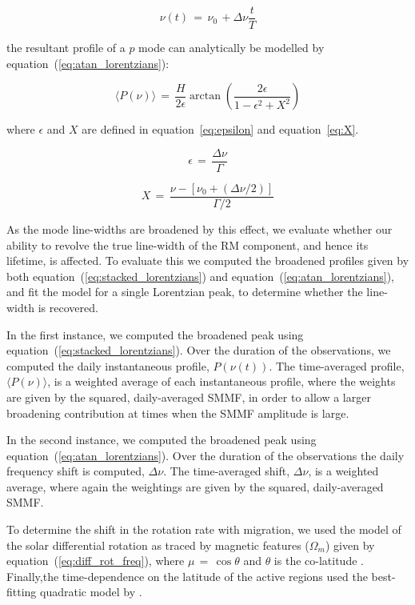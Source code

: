 \begin{equation}
\nu(t) \, = \, \nu_0 \, +  \Delta\nu \frac{t}{T}
\label{eq:linear_variation}
\end{equation}

the resultant profile of a $p$ mode can analytically be modelled by equation~(\ref{eq:atan_lorentzians}):

\begin{equation}
\langle P(\nu) \rangle \, = \, \frac{H}{2\epsilon} \arctan \left( \frac{2 \epsilon}{1 - \epsilon^2 + X^2 } \right)
\label{eq:atan_lorentzians}
\end{equation}

where $\epsilon$ and $X$ are defined in equation~\ref{eq:epsilon} and equation~\ref{eq:X}.

\begin{equation}
\epsilon \, = \, \frac{\Delta\nu}{\Gamma}
\label{eq:epsilon}
\end{equation}

\begin{equation}
X \, = \, \frac{\nu - [\nu_0 + (\Delta\nu/2)]}{\Gamma /2}
\label{eq:X}
\end{equation}

As the mode line-widths are broadened by this effect, we evaluate whether our ability to revolve the true line-width of the RM component, and hence its lifetime, is affected. To evaluate this we computed the broadened profiles given by both equation~(\ref{eq:stacked_lorentzians}) and equation~(\ref{eq:atan_lorentzians}), and fit the model for a single Lorentzian peak, to determine whether the line-width is recovered.

In the first instance, we computed the broadened peak using equation~(\ref{eq:stacked_lorentzians}). Over the duration of the observations, we computed the daily instantaneous profile, $P(\nu(t))$. The time-averaged profile, $ \langle P(\nu) \rangle$, is a weighted average of each instantaneous profile, where the weights are given by the squared, daily-averaged SMMF, in order to allow a larger broadening contribution at times when the SMMF amplitude is large.

In the second instance, we computed the broadened peak using equation~(\ref{eq:atan_lorentzians}). Over the duration of the observations the daily frequency shift is computed, $\Delta\nu$. The time-averaged shift, $\Delta\nu$, is a weighted average, where again the weightings are given by the squared, daily-averaged SMMF.

To determine the shift in the rotation rate with migration, we used the model of the solar differential rotation as traced by magnetic features ($\Omega_m$) given by equation~(\ref{eq:diff_rot_freq}), where $\mu \, = \, \cos \theta $ and $\theta$ is the co-latitude \citep{snodgrass_magnetic_1983, brown_inferring_1989}. Finally,the time-dependence on the latitude of the active regions used the best-fitting quadratic model by \cite{li_latitude_2001-1}.


